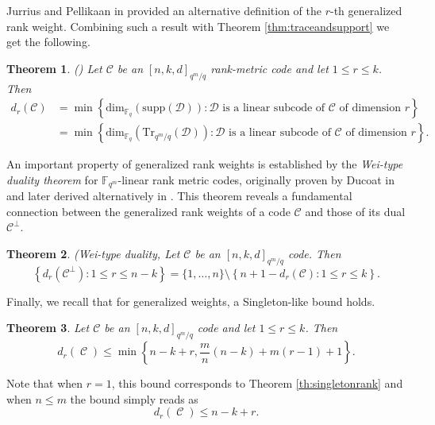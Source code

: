 \documentclass[11pt]{amsart}
\DeclareMathOperator{\C}{\mathcal{C}}
\newtheorem{theorem}{Theorem}[section]
\newcommand{\fqm}{\mathbb{F}_{q^m}}
\newcommand{\fq}{{\mathbb F}_{q}}
\begin{document}
Jurrius and Pellikaan in \cite[Section 5]{jurrius2017defining} provided an alternative definition of the $r$-th generalized
rank weight. Combining such a result with Theorem \ref{thm:traceandsupport} we get the following.

\begin{theorem} \label{thm:generalizedweightsminsupports}(\cite[Corollary 17,Theorem 21]{jurrius2017defining})
     Let $\mathcal{C}$ be an $[n,k,d]_{q^m/q}$ rank-metric code and let $1\leq r\leq k$. Then 
        \begin{align*}
            d_r(\mathcal{C})&=\min\left\{\mathrm{dim}_{\fq}(\mathrm{supp}(\mathcal{D}))\colon\mathcal{D}\text{ is a linear subcode of }\mathcal{C}\text{ of dimension }r\right\}\\
            &=\min\left\{\mathrm{dim}_{\fq}(\mathrm{Tr}_{q^m/q}(\mathcal{D}))\colon\mathcal{D}\text{ is a linear subcode of }\mathcal{C}\text{ of dimension }r\right\}.
        \end{align*}
\end{theorem}

An important property of generalized rank weights is established by  the {\it Wei-type duality theorem} for $\fqm$-linear rank metric codes,  originally proven by Ducoat in \cite[Theorem I.3]{ducoat2015generalized} and later derived alternatively in \cite[Theorem 7]{britz2020}. This theorem reveals a fundamental connection between the generalized rank weights of a code $\mathcal{C}$ and those of its dual  $\mathcal{C}^{\perp}$. 

\begin{theorem}{\textnormal{{(Wei-type duality, }}}
    \label{prop: Wei-type duality}
    Let $\mathcal{C}$ be an $[n,k,d]_{q^m/q}$ code. Then
            \[
            \left\{d_r(\mathcal{C}^\perp)\colon 1 \leq r \leq n-k\right\}=\{1, \ldots, n\}\setminus\left\{n+1-d_r(\mathcal{C})\colon 1 \leq r \leq k\right\}.
            \]    
\end{theorem}

Finally, we recall that for generalized weights, a Singleton-like bound holds.

\begin{theorem}\cite{martinez2016similarities}
     Let $\mathcal{C}$ be an $[n,k,d]_{q^m/q}$ code and let $1\leq r \leq k$. Then
     \[d_r(\C) \leq \min \left\{n-k+r,\frac{m}n(n-k)+m(r-1)+1\right\}. \]
\end{theorem}

Note that when $r=1$, this bound corresponds to Theorem \ref{th:singletonrank} and when $n\leq m$ the bound simply reads as 
\[d_r(\C) \leq n-k+r. \]
\end{document}
